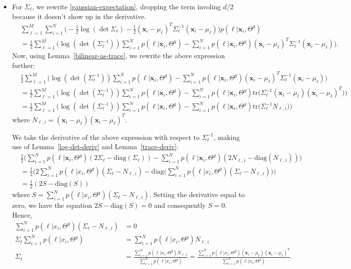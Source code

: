 \documentclass[10pt]{article}
\newcommand{\x}{\mathbf{x}}
\newcommand{\tr}{\mathrm{tr}}
\newcommand{\diag}{\mathrm{diag}}
\begin{document}
\begin{itemize}
    \item For $\Sigma_\ell$, we rewrite \eqref{gaussian-expectation}, dropping the term involing $d/2$ because it doesn't show up in the derivative.
    \begin{align*}
      & \sum_{\ell=1}^M \sum_{i=1}^N \bigg( -\frac{1}{2} \log(\det \Sigma_\ell) - \frac{1}{2} (\x_i - \mu_\ell)^T \Sigma_\ell^{-1} (\x_i - \mu_\ell) \bigg)p(\ell|\x_i,\Theta^g)\\
      &= \frac{1}{2}\sum_{\ell=1}^M \bigg( \log(\det(\Sigma_\ell^{-1})) \sum_{i=1}^N p(\ell|\x_i, \Theta^g) - \sum_{i=1}^N p(\ell|\x_i,\Theta^g) (\x_i - \mu_\ell)^T \Sigma_\ell^{-1} (\x_i- \mu_\ell)\bigg).
    \end{align*}    
    Now, using Lemma~\ref{bilinear-as-trace}, we rewrite the above expression further:
    \begin{align*}
      &\frac{1}{2}\sum_{\ell=1}^M \bigg( \log(\det(\Sigma_\ell^{-1})) \sum_{i=1}^N p(\ell|\x_i, \Theta^g) - \sum_{i=1}^N p(\ell|\x_i,\Theta^g) (\x_i - \mu_\ell)^T \Sigma_\ell^{-1} (\x_i- \mu_\ell)\bigg)\\
      &= \frac{1}{2}\sum_{\ell=1}^M \bigg( \log(\det(\Sigma_\ell^{-1})) \sum_{i=1}^N p(\ell|\x_i, \Theta^g) - \sum_{i=1}^N p(\ell|\x_i,\Theta^g) \tr\Big(\Sigma_\ell^{-1}(\x_i - \mu_\ell)(\x_i - \mu_\ell)^T\Big)\bigg)\\
      &= \frac{1}{2}\sum_{\ell=1}^M \bigg( \log(\det(\Sigma_\ell^{-1})) \sum_{i=1}^N p(\ell|\x_i, \Theta^g) - \sum_{i=1}^N p(\ell|\x_i,\Theta^g) \tr\Big(\Sigma_\ell^{-1}N_{\ell,i}\Big)\bigg)
    \end{align*}
    where $N_{\ell,i} = (\x_i - \mu_\ell)(\x_i - \mu_\ell)^T$.
    
    We take the derivative of the above expression with respect to $\Sigma_\ell^{-1}$, making use of Lemma~\ref{log-det-deriv} and Lemma~\ref{trace-deriv}:
    \begin{align*}
      &\frac{1}{2} \bigg( \sum_{i=1}^N p(\ell|\x_i,\Theta^g)(2\Sigma_\ell - \diag(\Sigma_\ell)) - \sum_{i=1}^N p(\ell|\x_i, \Theta^g)(2N_{\ell,i} - \diag(N_{\ell,i})) \bigg)\\      
      &= \frac{1}{2} \bigg(2\sum_{i=1}^N p(\ell|x_i,\Theta^g)(\Sigma_\ell - N_{\ell,i}) - \diag\bigg( \sum_{i=1}^N p(\ell|x_i,\Theta^g)(\Sigma_\ell - N_{\ell,i}) \bigg) \bigg)\\
      &= \frac{1}{2} (2S - \diag(S))
    \end{align*}
    where $S = \sum_{i=1}^N p(\ell|x_i,\Theta^g)(\Sigma_\ell - N_{\ell,i})$. Setting the derivative equal to zero, we have the equation $2S - \diag(S) = 0$ and consequently $S = 0$. Hence,
    \begin{align*}
      \sum_{i=1}^N p(\ell|x_i,\Theta^g)(\Sigma_\ell - N_{\ell,i}) 
      &= 0\\
      \Sigma_\ell \sum_{i=1}^N p(\ell|x_i,\Theta^g) &= \sum_{i=1}^N p(\ell|x_i,\Theta^g) N_{\ell,i}\\
      \Sigma_\ell &= \frac{\sum_{i=1}^N p(\ell|x_i,\Theta^g) N_{\ell,i}}{\sum_{i=1}^N p(\ell|x_i,\Theta^g)}
      = \frac{\sum_{i=1}^N p(\ell|x_i,\Theta^g) (\x_i - \mu_\ell)(\x_i - \mu_\ell)^T}{\sum_{i=1}^N p(\ell|x_i,\Theta^g)}.
    \end{align*}
    

\end{itemize}
\end{document}
